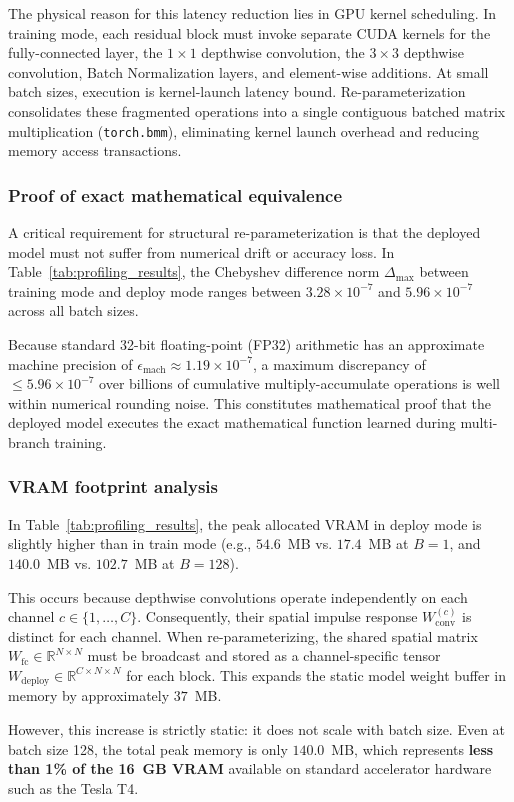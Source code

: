 The physical reason for this latency reduction lies in GPU kernel scheduling. In training mode, each residual block must invoke separate CUDA kernels for the fully-connected layer, the $1 \times 1$ depthwise convolution, the $3 \times 3$ depthwise convolution, Batch Normalization layers, and element-wise additions. At small batch sizes, execution is kernel-launch latency bound. Re-parameterization consolidates these fragmented operations into a single contiguous batched matrix multiplication (\texttt{torch.bmm}), eliminating kernel launch overhead and reducing memory access transactions.

\subsubsection{Proof of exact mathematical equivalence}
A critical requirement for structural re-parameterization is that the deployed model must not suffer from numerical drift or accuracy loss. In Table~\ref{tab:profiling_results}, the Chebyshev difference norm $\Delta_{\text{max}}$ between training mode and deploy mode ranges between $3.28 \times 10^{-7}$ and $5.96 \times 10^{-7}$ across all batch sizes.

Because standard 32-bit floating-point (FP32) arithmetic has an approximate machine precision of $\epsilon_{\text{mach}} \approx 1.19 \times 10^{-7}$, a maximum discrepancy of $\le 5.96 \times 10^{-7}$ over billions of cumulative multiply-accumulate operations is well within numerical rounding noise. This constitutes mathematical proof that the deployed model executes the exact mathematical function learned during multi-branch training.

\subsubsection{VRAM footprint analysis}
In Table~\ref{tab:profiling_results}, the peak allocated VRAM in deploy mode is slightly higher than in train mode (e.g., $54.6$~MB vs. $17.4$~MB at $B = 1$, and $140.0$~MB vs. $102.7$~MB at $B = 128$).

This occurs because depthwise convolutions operate independently on each channel $c \in \{1, \dots, C\}$. Consequently, their spatial impulse response $W_{\text{conv}}^{(c)}$ is distinct for each channel. When re-parameterizing, the shared spatial matrix $W_{\text{fc}} \in \mathbb{R}^{N \times N}$ must be broadcast and stored as a channel-specific tensor $W_{\text{deploy}} \in \mathbb{R}^{C \times N \times N}$ for each block. This expands the static model weight buffer in memory by approximately $37$~MB.

However, this increase is strictly static: it does not scale with batch size. Even at batch size 128, the total peak memory is only $140.0$~MB, which represents \textbf{less than 1\% of the 16~GB VRAM} available on standard accelerator hardware such as the Tesla T4.
